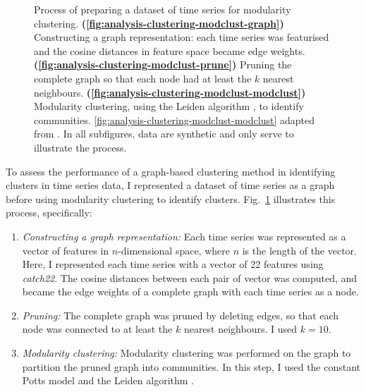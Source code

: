 \begin{figure}
  \caption[
    Process of preparing a dataset of time series for modularity clustering.
  ]{
    Process of preparing a dataset of time series for modularity clustering.
    \textbf{(\ref{fig:analysis-clustering-modclust-graph})}
    Constructing a graph representation: each time series was featurised and the cosine distances in feature space became edge weights.
    \textbf{(\ref{fig:analysis-clustering-modclust-prune})}
    Pruning the complete graph so that each node had at least the $k$ nearest neighbours.
    \textbf{(\ref{fig:analysis-clustering-modclust-modclust})}
    Modularity clustering, using the Leiden algorithm \parencite{traagLouvainLeidenGuaranteeing2019}, to identify communities.
    \ref{fig:analysis-clustering-modclust-modclust} adapted from \textcite{newmanModularityCommunityStructure2006}.
    In all subfigures, data are synthetic and only serve to illustrate the process.
  }
  \label{fig:analysis-clustering-modclust}
\end{figure}

To assess the performance of a graph-based clustering method in identifying clusters in time series data, I represented a dataset of time series as a graph before using modularity clustering to identify clusters.
Fig.\ \ref{fig:analysis-clustering-modclust} illustrates this process, specifically:
\begin{enumerate}
  \item \emph{Constructing a graph representation:}
        Each time series was represented as a vector of features in $n$-dimensional space, where $n$ is the length of the vector.
        Here, I represented each time series with a vector of 22 features using \textit{catch22}.
        The cosine distances between each pair of vector was computed, and became the edge weights of a complete graph with each time series as a node.
  \item \emph{Pruning:}
        The complete graph was pruned by deleting edges, so that each node was connected to at least the $k$ nearest neighbours.
        I used $k=10$.
  \item \emph{Modularity clustering:}
        Modularity clustering was performed on the graph to partition the pruned graph into communities.
        In this step, I used the constant Potts model \parencite{traagNarrowScopeResolutionlimitfree2011} and the Leiden algorithm \parencite{traagLouvainLeidenGuaranteeing2019}.
\end{enumerate}


